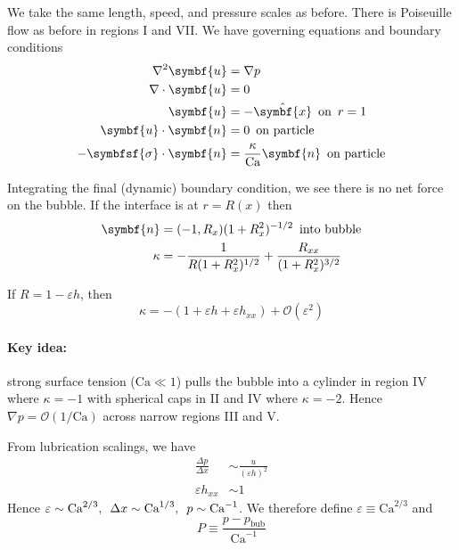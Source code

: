 \documentclass{jknotes}
\begin{document}
We take the same length, speed, and pressure scales as before. There is
Poiseuille flow as before in regions I and VII. We have governing equations
and boundary conditions
\begin{align}
	\nabla^2 \symbf{u} &= \nabla p \\
	\nabla \cdot \symbf{u} &= 0 \\
	\symbf{u} &= - \hat{\symbf{x}} \hspace{.5em} \text{on} \,\,\,
	r=1 \\
	\symbf{u}\cdot\symbf{n} &= 0 \hspace{.5em} \text{on particle} \\
	-\symbfsf{\sigma} \cdot \symbf{n} &= \frac{\kappa}{\text{Ca}} \symbf{n}
	\hspace{.5em} \text{on particle} 
\end{align}

Integrating the final (dynamic) boundary condition, we see there is no net
force on the bubble. If the interface is at $r = R(x)$ then
\begin{align}
	\symbf{n} &= (-1, R_x)(1+R^2_x)^{-1/2} \hspace{.5em} \text{into bubble} \\
	\kappa &= -\frac{1}{R(1+R^2_x)^{1/2}} + \frac{R_{xx}}{(1+R^2_x)^{3/2}}
\end{align}

If $R=1-\varepsilon h$, then
\begin{equation}
	\kappa = -(1+\varepsilon h + \varepsilon h_{xx}) +
	\mathcal{O}(\varepsilon^2)
\end{equation}

\paragraph{Key idea:} strong surface tension ($\text{Ca} \ll 1$) pulls the
bubble into a cylinder in region IV where $\kappa = - 1$ with spherical caps
in II and IV where $\kappa = -2$. Hence $\nabla p = \mathcal{O}(1/\text{Ca})$
across narrow regions III and V.

From lubrication scalings, we have
\begin{align}
	\frac{\Delta p}{\Delta x} &\sim \frac{u}{(\varepsilon h)^2} \\
	\varepsilon h_{xx} &\sim 1
\end{align}
Hence $\varepsilon \sim \text{Ca}^{2/3}, \hspace{.5em} \Delta x \sim
\text{Ca}^{1/3}, \hspace{.5em} p \sim \text{Ca}^{-1}$. We therefore define
$\varepsilon \equiv \text{Ca}^{2/3}$ and 
\begin{equation}
	P \equiv \frac{p - p_{\text{bub}}}{\text{Ca}^{-1}}
\end{equation}
\end{document}
